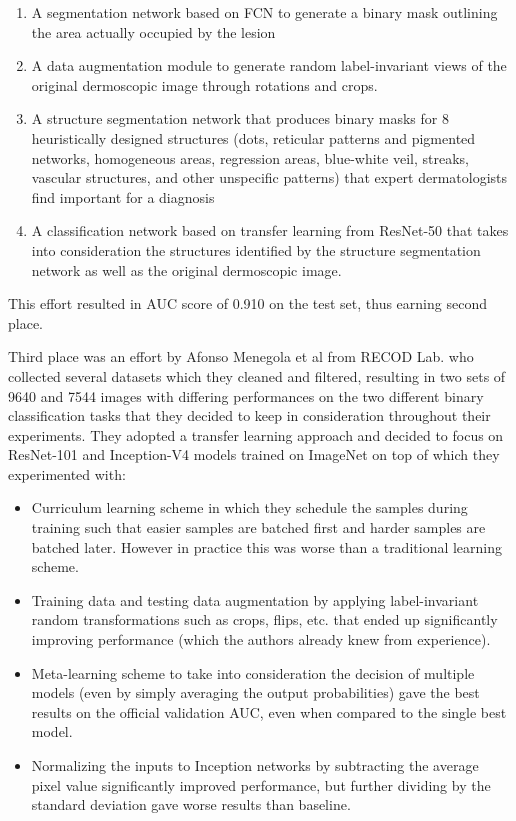 \begin{enumerate}
    \item A segmentation network based on \ac{FCN} \cite{fcn} to generate a binary mask outlining the area actually occupied by the lesion
    \item A data augmentation module to generate random label-invariant views of the original dermoscopic image through rotations and crops.
    \item A structure segmentation network that produces binary masks for 8 heuristically designed structures (dots, reticular patterns and pigmented networks, homogeneous areas, regression areas, blue-white veil, streaks, vascular structures, and other unspecific patterns) that expert dermatologists find important for a diagnosis
    \item A classification network based on transfer learning from ResNet-50 \cite{resnet} that takes into consideration the structures identified by the structure segmentation network as well as the original dermoscopic image.
\end{enumerate}

This effort resulted in AUC score of 0.910 on the test set, thus earning second place.

Third place was an effort by Afonso Menegola et al \cite{isic2017third} from RECOD Lab. who collected several datasets which they cleaned and filtered, resulting in two sets of 9640 and 7544 images with differing performances on the two different binary classification tasks that they decided to keep in consideration throughout their experiments. They adopted a transfer learning approach and decided to focus on ResNet-101 and Inception-V4 models trained on ImageNet on top of which they experimented with:

\begin{itemize}
    \item Curriculum learning scheme in which they schedule the samples during training such that easier samples are batched first and harder samples are batched later. However in practice this was worse than a traditional learning scheme.
    \item Training data and testing data augmentation by applying label-invariant random transformations such as crops, flips, etc. that ended up significantly improving performance (which the authors already knew from experience).
    \item Meta-learning scheme to take into consideration the decision of multiple models (even by simply averaging the output probabilities) gave the best results on the official validation AUC, even when compared to the single best model.
    \item Normalizing the inputs to Inception networks by subtracting the average pixel value significantly improved performance, but further dividing by the standard deviation gave worse results than baseline.
\end{itemize}

